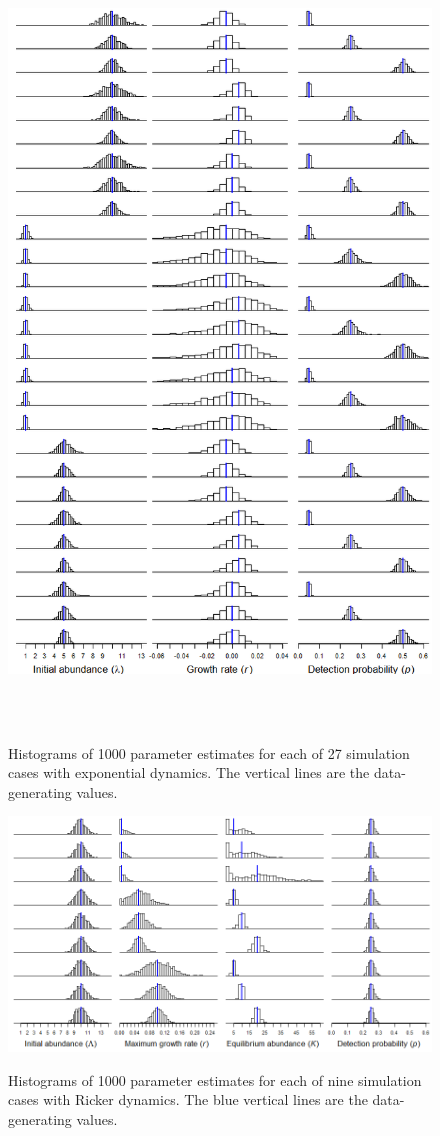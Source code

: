 \documentclass{article}
\begin{document}
\begin{figure}
\caption{Histograms of 1000 parameter estimates for each of 27
simulation cases with exponential dynamics. The vertical lines are the 
data-generating values.}
  \centering
  \includegraphics[height=8in]{../figs/exp_hists}
\label{fig:exp_hists}
\end{figure}



\begin{figure}
\caption{Histograms of 1000 parameter estimates for each of nine
simulation cases with Ricker dynamics. The blue vertical lines are the 
data-generating values.}
  \centering
  \includegraphics{../figs/rick_hists}
\label{fig:rick_hists}
\end{figure}
\end{document}
